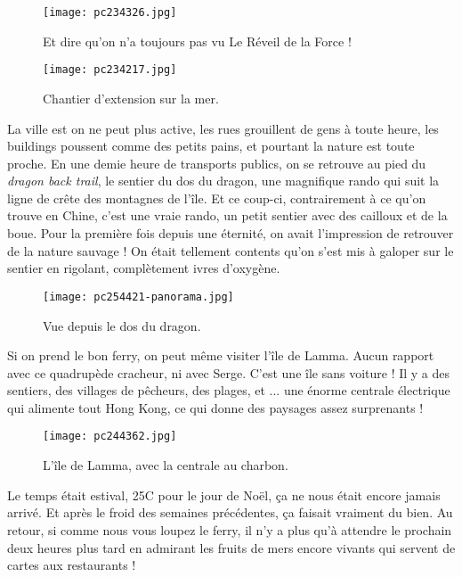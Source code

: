 \documentclass{book}
\begin{document}
\begin{figure}[h]
\centering
\texttt{[image: pc234326.jpg]}
\caption*{Et dire qu'on n'a toujours pas vu Le Réveil de la Force !}
\end{figure}


\begin{figure}[h]
\centering
\texttt{[image: pc234217.jpg]}
\caption*{Chantier d'extension sur la mer.}
\end{figure}

La ville est on ne peut plus active, les rues grouillent de gens à toute heure, les buildings poussent comme des petits pains, et pourtant la nature est toute proche. En une demie heure de transports publics, on se retrouve au pied du \emph{dragon back trail}, le sentier du dos du dragon, une magnifique rando qui suit la ligne de crête des montagnes de l'île. Et ce coup-ci, contrairement à ce qu'on trouve en Chine, c'est une vraie rando, un petit sentier avec des cailloux et de la boue. Pour la première fois depuis une éternité, on avait l'impression de retrouver de la nature sauvage ! On était tellement contents qu'on s'est mis à galoper sur le sentier en rigolant, complètement ivres d'oxygène.


\begin{figure}[h]
\centering
\texttt{[image: pc254421-panorama.jpg]}
\caption*{Vue depuis le dos du dragon.}
\end{figure}

Si on prend le bon ferry, on peut même visiter l'île de Lamma. Aucun rapport avec ce quadrupède cracheur, ni avec Serge. C'est une île sans voiture ! Il y a des sentiers, des villages de pêcheurs, des plages, et ... une énorme centrale électrique qui alimente tout Hong Kong, ce qui donne des paysages assez surprenants !


\begin{figure}[h]
\centering
\texttt{[image: pc244362.jpg]}
\caption*{L'île de Lamma, avec la centrale au charbon.}
\end{figure}

Le temps était estival, 25\textdegree C pour le jour de Noël, ça ne nous était encore jamais arrivé. Et après le froid des semaines précédentes, ça faisait vraiment du bien. Au retour, si comme nous vous loupez le ferry, il n'y a plus qu'à attendre le prochain deux heures plus tard en admirant les fruits de mers encore vivants qui servent de cartes aux restaurants !
\end{document}
